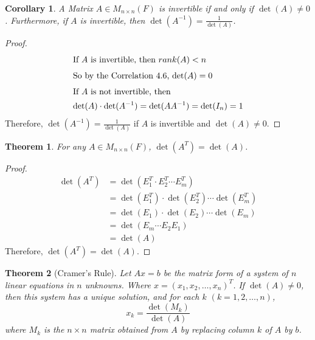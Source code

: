 \documentclass[10pt, oneside]{article}
\newtheorem{thm}{Theorem}
\newtheorem{cor}{Corollary}
\begin{document}
\begin{cor}
	A Matrix $A \in M_{n \times n}(F)$ is invertible if and only if $\det(A) \neq 0$. Furthermore, if $A$ is invertible, then $\det(A^{-1}) = \frac{1}{\det(A)}$.
\end{cor}

\begin{proof}
	\begin{align*}
		\intertext{If $A$ is invertible, then $rank(A) < n$}
		\intertext{So by the Correlation 4.6, $\det(A) = 0$}
		\intertext{If $A$ is not invertible, then}
		\det(A) \cdot \det(A^{-1}) & = \det(AA^{-1}) = \det(I_n) = 1 \\
	\end{align*}
	Therefore, $\det(A^{-1}) = \frac{1}{\det(A)}$ if $A$ is invertible and $\det(A) \neq 0$.
\end{proof}

\begin{thm}
	For any $A \in M_{n \times n}(F)$, $\det(A^T) = \det(A)$.
\end{thm}

\begin{proof}
	\begin{align*}
		\det(A^T) & = \det(E_1^T \cdot E_2^T \cdots E_m^T)             \\
		          & = \det(E_1^T) \cdot \det(E_2^T) \cdots \det(E_m^T) \\
		          & = \det(E_1) \cdot \det(E_2) \cdots \det(E_m)       \\
		          & = \det(E_m \cdots E_2E_1)                          \\
		          & = \det(A)
	\end{align*}
	Therefore, $\det(A^T) = \det(A)$.
\end{proof}

\begin{thm}[Cramer's Rule]
	Let $Ax = b$ be the matrix form of a system of $n$ linear equations in $n$ unknowns. Where $x = (x_1, x_2, \ldots, x_n)^T$. If $\det(A) \neq 0$, then this system has a unique solution, and
	for each $k$ $(k = 1, 2, \ldots, n)$,
	$$ x_k = \frac{\det(M_k)}{\det(A)} $$
	where $M_k$ is the $n \times n$ matrix obtained from $A$ by replacing column $k$ of $A$ by $b$.
\end{thm}
\end{document}
